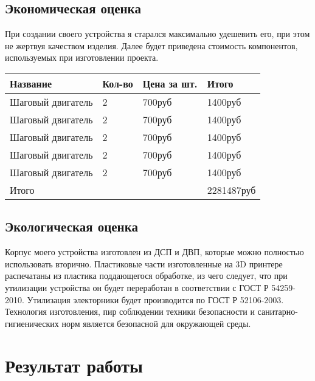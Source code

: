 \documentclass[a4paper]{article}
\begin{document}
  \subsection{Экономическая оценка}
  При создании своего устройства я старался максимально удешевить его, при этом не жертвуя качеством изделия. Далее будет приведена стоимость компонентов, используемых при изготовлении проекта.

  \begin{tabular}{|l|l|l|l|} \hline
    Название & Кол-во & Цена за шт. & Итого \\ \hline
    Шаговый двигатель & 2 & 700руб & 1400руб \\ \hline
    Шаговый двигатель & 2 & 700руб & 1400руб \\ \hline
    Шаговый двигатель & 2 & 700руб & 1400руб \\ \hline
    Шаговый двигатель & 2 & 700руб & 1400руб \\ \hline
    Шаговый двигатель & 2 & 700руб & 1400руб \\ \hline
    Итого & & & 2281487руб \\ \hline
  \end{tabular}
  \subsection{Экологическая оценка}
  Корпус моего устройства изготовлен из ДСП и ДВП, которые можно полностью использовать вторично. Пластиковые части изготовленные на 3D принтере распечатаны из пластика поддающегося обработке, из чего следует, что при утилизации устройства он будет переработан в соответствии с ГОСТ Р 54259-2010. Утилизация электорники будет производится по ГОСТ Р 52106-2003. Технология изготовления, пир соблюдении техники безопасности и санитарно-гигиенических норм является безопасной для окружающей среды.
  \section{Результат работы}
\end{document}
